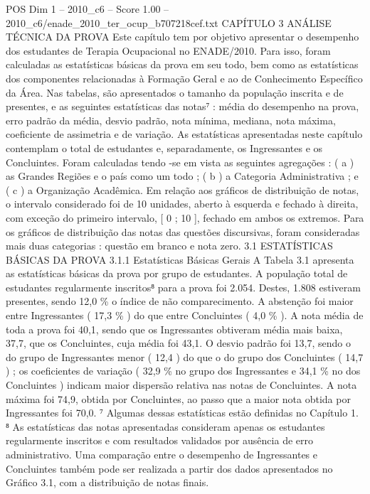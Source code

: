 \begin{textsample}{POS Dim 1 – 2010\_c6 – Score 1.00 – 2010\_c6/enade\_2010\_ter\_ocup\_b707218cef.txt}  \label{ex:f1_pos_163}
CAPÍTULO 3 ANÁLISE TÉCNICA DA PROVA Este capítulo tem por objetivo apresentar o desempenho dos estudantes de Terapia Ocupacional no ENADE/2010.
Para isso, foram calculadas as estatísticas básicas da prova em seu todo, bem como as estatísticas dos componentes relacionadas à Formação Geral e ao de Conhecimento Específico da Área.
Nas tabelas, são apresentados o tamanho da população inscrita e de presentes, e as seguintes estatísticas das notas⁷ : média do desempenho na prova, erro padrão da média, desvio padrão, nota mínima, mediana, nota máxima, coeficiente de assimetria e de variação.
As estatísticas apresentadas neste capítulo contemplam o total de estudantes e, separadamente, os Ingressantes e os Concluintes.
Foram calculadas tendo -se em vista as seguintes agregações : ( a ) as Grandes Regiões e o país como um todo ; ( b ) a Categoria Administrativa ; e ( c ) a Organização Acadêmica.
Em relação aos gráficos de distribuição de notas, o intervalo considerado foi de 10 unidades, aberto à esquerda e fechado à direita, com exceção do primeiro intervalo, [ 0 ; 10 ], fechado em ambos os extremos.
Para os gráficos de distribuição das notas das questões discursivas, foram consideradas mais duas categorias : questão em branco e nota zero. 3.1 ESTATÍSTICAS BÁSICAS DA PROVA 3.1.1 Estatísticas Básicas Gerais A Tabela 3.1 apresenta as estatísticas básicas da prova por grupo de estudantes.
A população total de estudantes regularmente inscritos⁸ para a prova foi 2.054.
Destes, 1.808 estiveram presentes, sendo 12,0 \% o índice de não comparecimento.
A abstenção foi maior entre Ingressantes ( 17,3 \% ) do que entre Concluintes ( 4,0 \% ).
A nota média de toda a prova foi 40,1, sendo que os Ingressantes obtiveram média mais baixa, 37,7, que os Concluintes, cuja média foi 43,1.
O desvio padrão foi 13,7, sendo o do grupo de Ingressantes menor ( 12,4 ) do que o do grupo dos Concluintes ( 14,7 ) ; os coeficientes de variação ( 32,9 \% no grupo dos Ingressantes e 34,1 \% no dos Concluintes ) indicam maior dispersão relativa nas notas de Concluintes.
A nota máxima foi 74,9, obtida por Concluintes, ao passo que a maior nota obtida por Ingressantes foi 70,0. ⁷ Algumas dessas estatísticas estão definidas no Capítulo 1. ⁸ As estatísticas das notas apresentadas consideram apenas os estudantes regularmente inscritos e com resultados validados por ausência de erro administrativo.
Uma comparação entre o desempenho de Ingressantes e Concluintes também pode ser realizada a partir dos dados apresentados no Gráfico 3.1, com a distribuição de notas finais.

\end{textsample}
